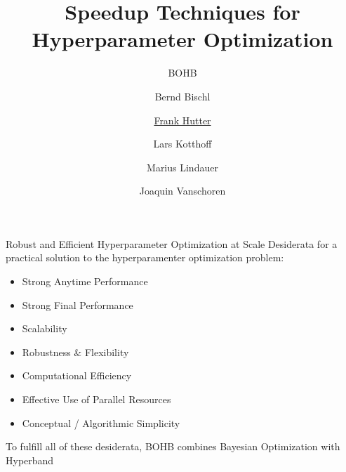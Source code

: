 

\title{Speedup Techniques for Hyperparameter Optimization}
\subtitle{BOHB}
\author[Frank Hutter]{Bernd Bischl \and \underline{Frank Hutter} \and Lars Kotthoff\newline \and Marius Lindauer \and Joaquin Vanschoren}
\institute{}
\date{}




\maketitle

\begin{frame}[c]{Robust and Efficient Hyperparameter Optimization at Scale}
Desiderata for a practical solution to the hyperparamenter optimization problem:
\begin{itemize}
    \item Strong Anytime Performance
    \item Strong Final Performance
    \item Scalability
    \item Robustness $\&$ Flexibility
    \item Computational Efficiency
    \item Effective Use of Parallel Resources
    \item Conceptual / Algorithmic Simplicity
    \pause
\end{itemize}
\bigskip
To fulfill all of these desiderata, BOHB  combines Bayesian Optimization with Hyperband  

\end{frame}
